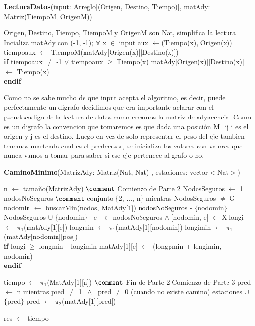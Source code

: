 \documentclass[spanish,12pt]{article}
\begin{document}
\begin{algorithm}[H]{\textbf{LecturaDatos}(input: Arreglo[(Origen, Destino, Tiempo)], matAdy: Matriz(TiempoM, OrigenM))}
	\begin{algorithmic}[1]
		\State Origen, Destino, Tiempo, TiempoM y OrigenM son Nat, simplifica la lectura
		\State Incializa matAdy con (-1, -1);
		\State $\forall$ x $\in$ input
		\State \quad aux $\gets$(Tiempo(x), Origen(x))
		\State \quad tiempoaux $\gets$ TiempoM(matAdy[Origen(x)][Destino(x)])
\\
		\qquad \textbf{if} tiempoaux $\neq$ -1 $\vee$ tiempoaux $\geq$ Tiempo(x)
			\State \qquad \quad matAdy[Origen(x)][Destino(x)] $\gets$ Tiempo(x)
\\
		 \qquad \textbf{endif}
	\end{algorithmic}
\end{algorithm}

	Como no se sabe mucho de que input acepta el algoritmo, es decir, puede perfectamente un digrafo decidimos que era importante aclarar con el pseudocodigo de la lectura de datos como creamos la matriz de adyacencia. Como es un digrafo la convencion que tomaremos es que dada una posición M_{ij} i es el origen y j es el destino. Luego en vez de solo representar el peso del eje tambien tenemos martcado cual es el predecesor, se inicializa los valores con valores que nunca vamos a tomar para saber si ese eje pertenece al grafo o no.

\begin{algorithm}[H]{\textbf{CaminoMinimo}(MatrizAdy: Matriz(Nat, Nat) , estaciones: vector$<$Nat$>$)}
	\begin{algorithmic}[1]

		\State n $\gets$ tamaño(MatrizAdy) $\comment$ Comienzo de Parte 2
		\State NodosSeguros $\gets$ 1
		\State nodosNoSeguros $\comment$ conjunto $\{$2, ..., n$\}$
		\State mientras NodosSeguros $\neq$ G
		\State \quad nodomin $\gets$ buscarMin(nodos, MatAdy[1])
		\State \quad nodosNoSeguros - $\{$nodomin$\}$
		\State \quad NodosSeguros $\cup$ $\{$nodomin$\}$
		\State \quad \forall \ e \ $\in$ nodosNoSeguros $\land$ [nodomin, e] $\in$ X
		\State \qquad longi $\gets$ $\pi_{1}$(matAdy[1][e])
		\State \qquad longmin $\gets$ $\pi_{1}$(matAdy[1][nodomin])
		\State \qquad longimin $\gets$ $\pi_{1}$(matAdy[nodomin][pos])
\\
		\qquad \textbf{if} longi $\geq$ longmin +longimin
			\State \qquad \quad matAdy[1][e] $\gets$ (longpmin + longimin, nodomin)
\\
 \qquad \textbf{endif}

		\State tiempo $\gets$ $\pi_{1}$(MatAdy[1][n]) $\comment$ Fin de Parte 2 Comienzo de Parte 3
		\State pred $\gets$ n
		\State mientras pred $\neq$ 1 \ $\land$ \ pred $\neq$ 0 (cuando no existe camino)
		\State \quad estaciones $\cup$ $\{$pred$\}$
		\State \quad pred $\gets$ $\pi_{2}$(matAdy[1][pred])

		\State res $\gets$ tiempo
 	\end{algorithmic}
\end{algorithm}
\end{document}

